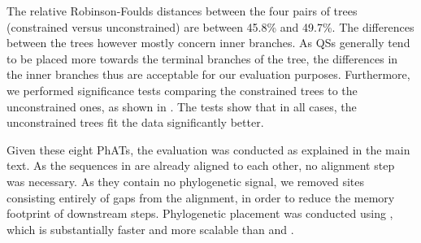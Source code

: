 The relative Robinson-Foulds distances \citep{Robinson1981}
between the four pairs of trees (constrained versus unconstrained) are between \num{45.8}\% and \num{49.7}\%.
%
The differences between the trees however mostly concern inner branches.
As \acp{QS} generally tend to be placed more towards the terminal branches of the tree,
the differences in the inner branches thus are acceptable for our evaluation purposes.
Furthermore, we performed significance tests comparing the constrained trees to the unconstrained ones,
as shown in .
The tests show that in all cases, the unconstrained trees fit the data significantly better.

Given these eight \acp{PhAT}, the evaluation was conducted as explained in the main text.
As the sequences in  are already aligned to each other, no alignment step was necessary.
As they contain no phylogenetic signal, we removed sites consisting entirely of gaps from the alignment,
in order to reduce the memory footprint of downstream steps.
Phylogenetic placement was conducted using  \citep{Barbera2018},
which is substantially faster and more scalable
than  \citep{Berger2011} and  \citep{Matsen2010}.

